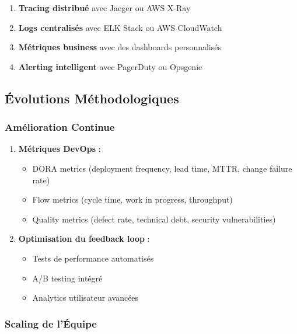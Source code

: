 \begin{enumerate}
    \item \textbf{Tracing distribué} avec Jaeger ou AWS X-Ray
    \item \textbf{Logs centralisés} avec ELK Stack ou AWS CloudWatch
    \item \textbf{Métriques business} avec des dashboards personnalisés
    \item \textbf{Alerting intelligent} avec PagerDuty ou Opsgenie
\end{enumerate}

\subsection{Évolutions Méthodologiques}

\subsubsection{Amélioration Continue}

\begin{enumerate}
    \item \textbf{Métriques DevOps} :
    \begin{itemize}
        \item DORA metrics (deployment frequency, lead time, MTTR, change failure rate)
        \item Flow metrics (cycle time, work in progress, throughput)
        \item Quality metrics (defect rate, technical debt, security vulnerabilities)
    \end{itemize}
    
    \item \textbf{Optimisation du feedback loop} :
    \begin{itemize}
        \item Tests de performance automatisés
        \item A/B testing intégré
        \item Analytics utilisateur avancées
    \end{itemize}
\end{enumerate}

\subsubsection{Scaling de l'Équipe}


